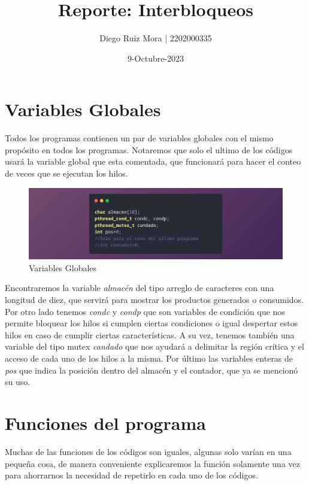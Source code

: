 \documentclass[10pt]{article}
\title{\textbf{Reporte: Interbloqueos}}
\author{Diego Ruiz Mora | 2202000335}
\date{9-Octubre-2023}
\begin{document}
	
	\maketitle
	\section{Variables Globales}
	Todos los programas contienen un par de variables globales con el mismo propósito en todos los programas.  Notaremos que solo el ultimo de los códigos  usará la variable global que esta comentada, que funcionará para hacer el conteo de veces que se ejecutan los hilos. 
	\begin{figure}[h!]
		\centering
		\includegraphics[width=\linewidth]{valGob.png}
		\caption{Variables Globales}
		\label{fig:vg}
	\end{figure}
	Encontraremos la variable \emph{almacén} del tipo arreglo de caracteres con una longitud de diez, que servirá para mostrar los productos generados o consumidos. Por otro lado tenemos \emph{condc} y \emph{condp} que son variables de condición que nos permite bloquear los hilos si cumplen ciertas condiciones o igual despertar estos hilos en caso de cumplir ciertas características.  A su vez, tenemos también una variable del tipo mutex \emph{candado}  que nos ayudará a delimitar la región crítica y el acceso de cada uno de los hilos a la misma. Por último las variables enteras de \emph{pos} que indica la posición dentro del almacén y el contador, que ya se mencionó su uso.  
	\section{Funciones del programa}
	Muchas de las funciones de los códigos son iguales, algunas solo varían en una pequeña cosa, de manera conveniente explicaremos la función solamente una vez para ahorrarnos la necesidad de repetirlo en cada uno de los códigos.  
\end{document}
